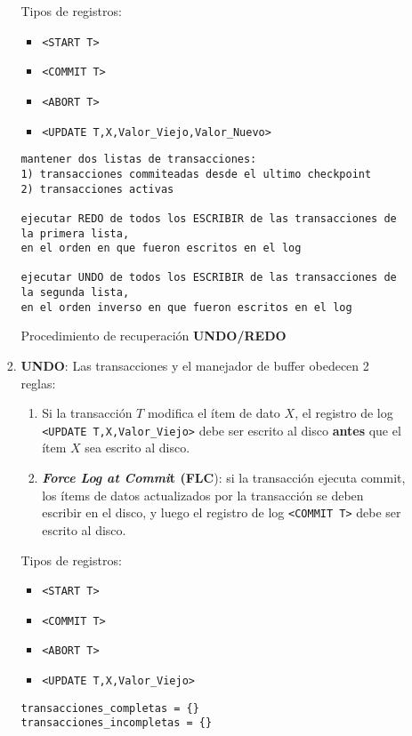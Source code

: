 \documentclass[a4paper, twoside]{article}
\begin{document}
\begin{itemize}
\begin{itemize}
\begin{enumerate}
				Tipos de registros:
				\begin{itemize}
					\item \texttt{<START T>}
					\item \texttt{<COMMIT T>}
					\item \texttt{<ABORT T>}
					\item \texttt{<UPDATE T,X,Valor\_Viejo,Valor\_Nuevo>}
				\end{itemize}
				
				\begin{algorithm}[H]
					\begin{lstlisting}
mantener dos listas de transacciones:
1) transacciones commiteadas desde el ultimo checkpoint
2) transacciones activas

ejecutar REDO de todos los ESCRIBIR de las transacciones de la primera lista, 
en el orden en que fueron escritos en el log

ejecutar UNDO de todos los ESCRIBIR de las transacciones de la segunda lista, 
en el orden inverso en que fueron escritos en el log
					\end{lstlisting}
					\caption{Procedimiento de recuperación \textbf{UNDO/REDO}}
				\end{algorithm}

			\item \textbf{UNDO}: Las transacciones y el manejador de buffer obedecen 2 reglas:
			\begin{enumerate}
				\item Si la transacción $T$ modifica el ítem de dato $X$, el registro de log \texttt{<UPDATE T,X,Valor\_Viejo>} debe ser escrito al disco \textbf{antes} que el ítem $X$ sea escrito al disco.
				\item \textbf{\emph{Force Log at Commi}}\textbf{t (FLC}): si la transacción ejecuta commit, los ítems de datos actualizados por la transacción se deben escribir en el disco, y luego el registro de log \texttt{<COMMIT T>} debe ser escrito al disco.
			\end{enumerate}

			Tipos de registros:
			\begin{itemize}
				\item \texttt{<START T>}
				\item \texttt{<COMMIT T>}
				\item \texttt{<ABORT T>}
				\item \texttt{<UPDATE T,X,Valor\_Viejo>}
			\end{itemize}

			\begin{algorithm}[H]
				\begin{lstlisting}
transacciones_completas = {}
transacciones_incompletas = {}


\end{lstlisting}
\end{algorithm}
\end{enumerate}
\end{itemize}
\end{itemize}
\end{document}
